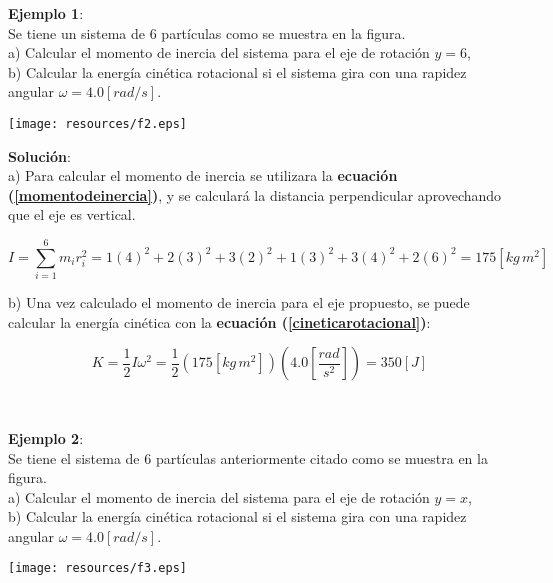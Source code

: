 \documentclass[letter,oneside,11pt]{article}
\begin{document}
\begin{minipage}[b]{.4\linewidth}
\textbf{Ejemplo 1}:\\
Se tiene un sistema de 6 partículas como se muestra en la figura. \\

a) Calcular el momento de inercia del sistema para el eje de rotación $y = 6$, \\
b) Calcular la energía cinética rotacional si el sistema gira con una rapidez
angular $\omega = 4.0 [rad/s]$.
\end{minipage}\hfill
\begin{minipage}{.5\linewidth}
\texttt{[image: resources/f2.eps]}
\end{minipage}

\begin{minipage}[b]{.9\linewidth}
\textbf{Solución}:\\
a) Para calcular el momento de inercia se utilizara la \textbf{ecuación
(\ref{momentodeinercia})}, y se calculará la distancia perpendicular
aprovechando que el eje es vertical.

\begin{equation*}
    I = \sum_{i=1}^{6} m_i r^2_i = 1 (4)^2 + 2(3)^2 + 3(2)^2 + 1(3)^2 + 3(4)^2 + 2(6)^2 = 175 [kg\, m^2]
\end{equation*}

b) Una vez calculado el momento de inercia para el eje propuesto, se puede
calcular la energía cinética con la \textbf{ecuación
(\ref{cineticarotacional})}:

\begin{equation*}
    K = \frac{1}{2} I \omega^2 =  \frac{1}{2} \left(175 [kg\, m^2]\right) \left(4.0 \left[\frac{rad}{s^2}\right]\right) = 350 [J]
\end{equation*}
\end{minipage}
\\

\begin{minipage}[b]{.4\linewidth}
\textbf{Ejemplo 2}:\\
Se tiene el sistema de 6 partículas anteriormente citado como se muestra en la
figura. \\

a) Calcular el momento de inercia del sistema para el eje de rotación $y = x$, \\
b) Calcular la energía cinética rotacional si el sistema gira con una rapidez
angular $\omega = 4.0 [rad/s]$.
\end{minipage}\hfill
\begin{minipage}{.5\linewidth}
\texttt{[image: resources/f3.eps]}
\end{minipage}
\end{document}
